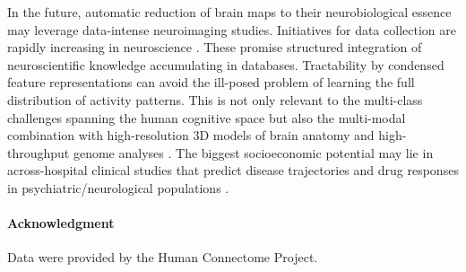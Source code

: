 \documentclass{article} %
\begin{document}
In the future, automatic reduction of brain maps to
their neurobiological essence
may leverage data-intense neuroimaging studies.
Initiatives for data collection are rapidly increasing
in neuroscience \cite{poldrack2014data}.
These promise structured integration
of neuroscientific knowledge accumulating
in databases.
Tractability by
condensed feature representations can avoid the ill-posed problem of
learning the full distribution of activity patterns.
%
This is not only relevant to the 
multi-class challenges spanning the human cognitive space
\cite{schwartz2013mapping}
but also the
multi-modal combination with
high-resolution 3D models of brain anatomy \cite{amunts2013bigbrain}
and
high-throughput genome analyses \cite{need2010gwas}.
%
The biggest socioeconomic potential may
lie in across-hospital clinical studies that
predict disease trajectories and drug responses
in psychiatric/neurological populations
\cite{frackowiak2015future, gustav2011cost}.

\paragraph{Acknowledgment}
{\small
Data were provided by the Human Connectome Project.
}

\small


\end{document}
